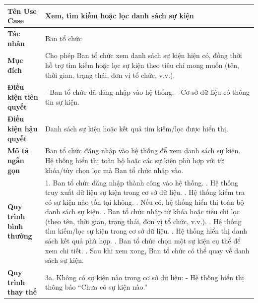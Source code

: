 
\begin{table}[H]
\centering
\renewcommand{\arraystretch}{1.3}
\setlength{\tabcolsep}{8pt}
\begin{tabularx}{\textwidth}{|l|X|}
\hline
\textbf{Tên Use Case} & Xem, tìm kiếm hoặc lọc danh sách sự kiện \\ \hline
\textbf{Tác nhân} & Ban tổ chức \\ \hline
\textbf{Mục đích} & 
Cho phép Ban tổ chức xem danh sách sự kiện hiện có, đồng thời hỗ trợ tìm kiếm hoặc lọc sự kiện theo tiêu chí mong muốn (tên, thời gian, trạng thái, đơn vị tổ chức, v.v.). \\ \hline
\textbf{Điều kiện tiên quyết} & 
- Ban tổ chức đã đăng nhập vào hệ thống. \newline
- Cơ sở dữ liệu có thông tin sự kiện. \\ \hline
\textbf{Điều kiện hậu quyết} & 
Danh sách sự kiện hoặc kết quả tìm kiếm/lọc được hiển thị. \\ \hline
\textbf{Mô tả ngắn gọn} & 
Ban tổ chức đăng nhập vào hệ thống để xem danh sách sự kiện. Hệ thống hiển thị toàn bộ hoặc các sự kiện phù hợp với từ khóa/tùy chọn lọc mà Ban tổ chức nhập vào. \\ \hline
\textbf{Quy trình bình thường} &
1. Ban tổ chức đăng nhập thành công vào hệ thống. \newline
2. Hệ thống truy xuất dữ liệu sự kiện trong cơ sở dữ liệu. \newline
3. Hệ thống kiểm tra có sự kiện nào tồn tại không. \newline
4. Nếu có, hệ thống hiển thị toàn bộ danh sách sự kiện. \newline
5. Ban tổ chức nhập từ khóa hoặc tiêu chí lọc (theo tên, thời gian, trạng thái, đơn vị tổ chức, v.v.). \newline
6. Hệ thống tìm kiếm/lọc sự kiện trong cơ sở dữ liệu. \newline
7. Hệ thống hiển thị danh sách kết quả phù hợp. \newline
8. Ban tổ chức chọn một sự kiện cụ thể để xem chi tiết. \newline
9. Sau khi xem xong, Ban tổ chức có thể quay về danh sách sự kiện. \\ \hline
\textbf{Quy trình thay thế} &
3a. Không có sự kiện nào trong cơ sở dữ liệu: \newline
\hspace*{1em}- Hệ thống hiển thị thông báo “Chưa có sự kiện nào.” \newline

\end{tabularx}
\end{table}
